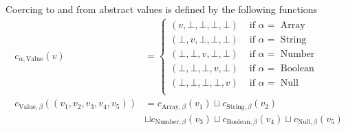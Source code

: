 Coercing to and from abstract values is defined by the following functions
\begin{align*}
c_{\alpha,\text{Value}}(v) &=   \begin{cases} 
       (v, \bot, \bot, \bot, \bot) & \text{ if $\alpha = $ Array} \\
       (\bot, v, \bot, \bot, \bot) & \text{ if $\alpha = $ String} \\
       ( \bot, \bot, v, \bot, \bot) & \text{ if $\alpha = $ Number} \\
       (\bot, \bot, \bot,v,  \bot) & \text{ if $\alpha = $ Boolean} \\
       (\bot, \bot, \bot, \bot, v) & \text{ if $\alpha = $ Null} \\
  \end{cases}\\
  c_{\text{Value}, \beta}((v_1, v_2, v_3, v_4, v_5)) &= 
  c_{\text{Array}, \beta}(v_1) \sqcup c_{\text{String}, \beta}(v_2) \\ 
  &\sqcup c_{\text{Number}, \beta}(v_3) \sqcup c_{\text{Boolean},\beta}(v_4) \sqcup c_{\text{Null}, \beta}(v_5)\\
\end{align*}
